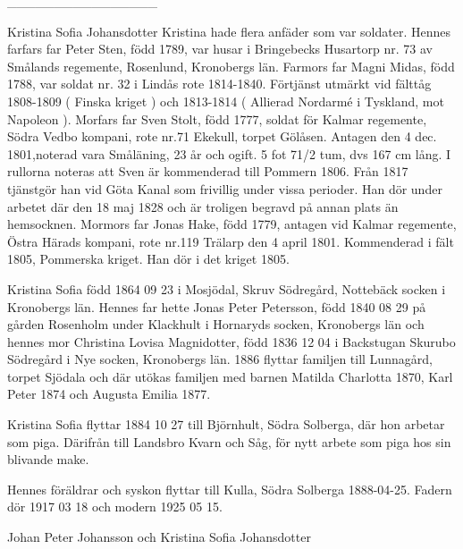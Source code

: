 ________________


Kristina Sofia Johansdotter
Kristina hade flera anfäder som var soldater. Hennes farfars far Peter Sten, född 1789, var husar i Bringebecks Husartorp nr. 73 av Smålands regemente, Rosenlund, Kronobergs län.
Farmors far Magni Midas, född 1788, var soldat nr. 32 i Lindås rote 1814-1840. Förtjänst utmärkt vid fälttåg 1808-1809 ( Finska kriget ) och 1813-1814 ( Allierad Nordarmé i Tyskland, mot Napoleon ). 
Morfars far Sven Stolt, född 1777, soldat  för Kalmar regemente, Södra Vedbo kompani, rote nr.71 Ekekull, torpet Gölåsen. Antagen den 4 dec. 1801,noterad vara Småläning, 23 år och ogift. 5 fot 71/2 tum, dvs 167 cm lång. I rullorna noteras att Sven är kommenderad till Pommern 1806. Från 1817 tjänstgör han vid Göta Kanal som frivillig under vissa perioder. Han dör  under arbetet där den 18 maj 1828 och är troligen begravd på annan plats än hemsocknen.
Mormors far Jonas Hake, född 1779, antagen vid Kalmar regemente, Östra Härads kompani, rote nr.119 Trälarp den 4 april 1801. Kommenderad i fält 1805, Pommerska kriget. Han dör i det kriget 1805.


Kristina Sofia född 1864 09 23 i Mosjödal, Skruv Södregård, Nottebäck socken i Kronobergs län. Hennes far hette Jonas Peter Petersson, född 1840 08 29 på gården Rosenholm under Klackhult i Hornaryds socken, Kronobergs län och hennes mor Christina Lovisa Magnidotter, född 1836 12 04 i Backstugan Skurubo Södregård i Nye socken, Kronobergs län.
1886 flyttar familjen till Lunnagård, torpet Sjödala och där utökas familjen med barnen Matilda Charlotta 1870, Karl Peter 1874 och Augusta Emilia 1877.


Kristina Sofia flyttar 1884 10 27 till Björnhult, Södra Solberga, där hon arbetar som piga. Därifrån till Landsbro Kvarn och Såg, för nytt arbete som piga hos sin blivande make.


Hennes föräldrar och syskon flyttar till Kulla, Södra Solberga 1888-04-25. 
Fadern dör 1917 03 18 och modern 1925 05 15.
 










Johan Peter Johansson och Kristina Sofia Johansdotter


